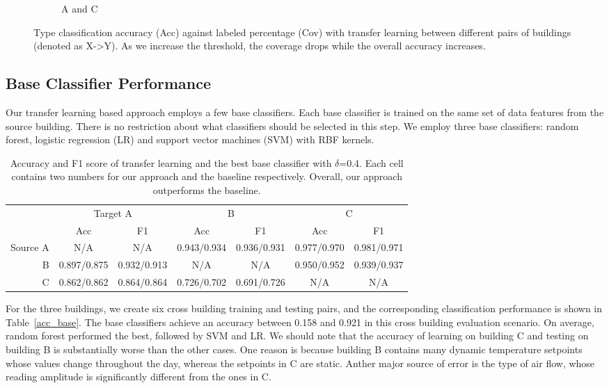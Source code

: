 \begin{figure}[ht!]
\begin{subfigure}{0.32\textwidth}
                \caption{A and C}
  \end{subfigure}
\caption{Type classification accuracy (Acc) against labeled percentage (Cov) with transfer learning between different pairs of buildings (denoted as X->Y). As we increase the threshold, the coverage drops while the overall accuracy increases. }
\label{fig:tl_acc}
\end{figure}

\subsection{Base Classifier Performance}
\label{sec:baseline}
Our transfer learning based approach employs a few base classifiers. Each base classifier is trained on the same set of data features from the source building. There is no restriction about what classifiers should be selected in this step.
We employ three base classifiers: random forest, logistic regression (LR) and support vector machines (SVM) with RBF kernels.


\begin{table}[]
\centering
\begin{tabular}{r|c|c|c|c|c|c}
\hline
\multirow{2}{*}{} & \multicolumn{2}{c|}{Target A} & \multicolumn{2}{c|}{B} & \multicolumn{2}{c}{C} \\ \cline{2-7}
                  & Acc        & F1        & Acc        & F1        & Acc        & F1        \\ \hline\hline
Source A                 & N/A      & N/A     & 0.943/0.934      & 0.936/0.931     & 0.977/0.970      & 0.981/0.971     \\ \hline
B                 & 0.897/0.875     & 0.932/0.913     & N/A      & N/A     & 0.950/0.952      & 0.939/0.937     \\ \hline
C                 & 0.862/0.862     & 0.864/0.864     & 0.726/0.702      & 0.691/0.726     & N/A     & N/A     \\ \hline
\end{tabular}
\caption{Accuracy and F1 score of transfer learning and the best base classifier with $\delta$=0.4. Each cell contains two numbers for our approach and the baseline respectively. Overall, our approach outperforms the baseline.}
\label{table:f1}
\end{table}

For the three buildings, we create six cross building training and testing pairs, and the corresponding classification performance is shown in Table~\ref{acc_base}. The base classifiers achieve an accuracy between 0.158 and 0.921 in this cross building evaluation scenario.
On average, random forest performed the best, followed by SVM and LR.
We should note that the accuracy of learning on building C and testing on building B is substantially worse than the other cases.
One reason is because building B contains many dynamic temperature setpoints whose values change throughout the day, whereas the setpoints in C are static.
Anther major source of error is the type of air flow, whose reading amplitude is significantly different from the ones in C. %


